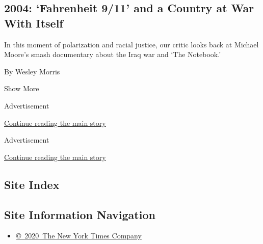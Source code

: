 \begin{enumerate}
  \hypertarget{2004-fahrenheit-911-and-a-country-at-war-with-itself}{%
  \subsection{2004: `Fahrenheit 9/11' and a Country at War With
  Itself}\label{2004-fahrenheit-911-and-a-country-at-war-with-itself}}

  In this moment of polarization and racial justice, our critic looks
  back at Michael Moore's smash documentary about the Iraq war and `The
  Notebook.'

  By Wesley Morris
\end{enumerate}

Show More

Advertisement

\protect\hyperlink{after-mid1}{Continue reading the main story}

Advertisement

\protect\hyperlink{after-mktg}{Continue reading the main story}

\hypertarget{site-index}{%
\subsection{Site Index}\label{site-index}}

\hypertarget{site-information-navigation}{%
\subsection{Site Information
Navigation}\label{site-information-navigation}}

\begin{itemize}
\tightlist
\item
  \href{https://help.nytimes.com/hc/en-us/articles/115014792127-Copyright-notice}{©~2020~The
  New York Times Company}
\end{itemize}

